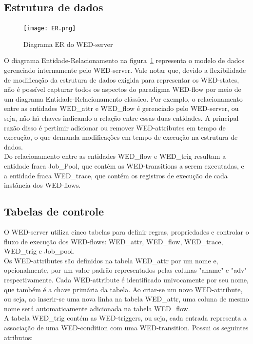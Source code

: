 \documentclass[conference]{IEEEtran}
\begin{document}
\subsection{Estrutura de dados}

\begin{figure}[!t]
\centering
\texttt{[image: ER.png]}
\caption{Diagrama ER do WED-server}
\label{fig_er}

\end{figure}
 O diagrama Entidade-Relacionamento na figura~\ref{fig_er} representa o modelo de dados gerenciado internamente pelo 
WED-server. Vale notar que, devido a flexibilidade de modificação da estrutura de dados exigida para representar os WED-states, 
não é possível capturar todos os aspectos do paradigma WED-flow por meio de um diagrama Entidade-Relacionamento clássico. Por exemplo,
o relacionamento entre as entidades WED\_attr e WED\_flow é gerenciado pelo WED-server, ou seja, não há chaves indicando
a relação entre essas duas entidades. A principal razão disso é pertimir adicionar ou remover WED-attributes em tempo de execução, 
o que demanda modificações em tempo de execução na estrutura de dados.
\\
\indent Do relacionamento entre as entidades WED\_flow e WED\_trig resultam a entidade fraca Job\_Pool, que contém as WED-transitions
a serem executadas, e a entidade fraca WED\_trace, que contém os registros de execução de cada instância dos WED-flows.

\subsection{Tabelas de controle}

O WED-server utiliza cinco tabelas para definir regras, propriedades e controlar o fluxo de execução dos WED-flows: WED\_attr,
WED\_flow, WED\_trace, WED\_trig e Job\_pool.
\\
\indent  Os WED-attributes são definidos na tabela WED\_attr por um nome e, opcionalmente, por um valor padrão representados 
pelas colunas "aname" e "adv" respectivamente. Cada WED-attribute é identificado univocamente por seu nome, que também é 
a chave primária da tabela. Ao criar-se um novo WED-attribute, ou seja, ao inserir-se uma nova linha na tabela WED\_attr, 
uma coluna de mesmo nome será automaticamente adicionada na tabela WED\_flow.
\\
\indent A tabela WED\_trig contém as WED-triggers, ou seja, cada entrada representa a associação de uma WED-condition com uma 
WED-transition. Possui os seguintes atributos:
\end{document}
